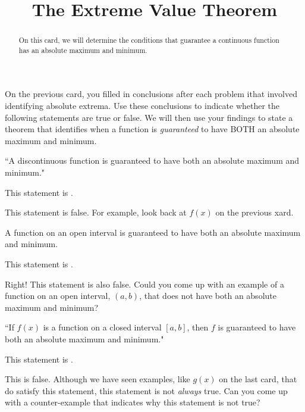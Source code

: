 \documentclass{ximera}
\title[Dig-In:]{The Extreme Value Theorem}
\begin{document}
\begin{abstract}
On this card, we will determine the conditions that guarantee a continuous function has an absolute maximum and minimum. 
\end{abstract}
\maketitle

On the previous card, you filled in conclusions after each problem ithat involved identifying absolute extrema.  Use these conclusions to indicate whether the following statements are true or false.  We will then use your findings to state a theorem that identifies when a function is \textit{guaranteed} to have BOTH an absolute maximum and minimum.  

\begin{exercise}
\begin{center} ``A discontinuous function is guaranteed to have both an absolute maximum and minimum." \end{center}

This statement is .

\begin{feedback}[correct]
This statement is false.  For example, look back at $f(x)$ on the previous xard.
\end{feedback}
\end{exercise}

\begin{exercise}
\begin{center} A function on an open interval is guaranteed to have both an absolute maximum and minimum. \end{center}

This statement is .

\begin{feedback}[correct]
Right!  This statement is also false. Could you come up with an example of a function on an open interval, $(a,b)$, that does not have both an absolute maximum and minimum?
\end{feedback}
\end{exercise}

\begin{exercise}
\begin{center} ``If $f(x)$ is a function on a closed interval $[a,b]$, then $f$ is guaranteed to have both an absolute maximum and minimum." \end{center}

This statement is .

\begin{feedback}[correct]
This is false.  Although we have seen examples, like $g(x)$ on the last card, that do satisfy this statement, this statement is not \textit{always} true.  Can you come up with a counter-example that indicates why this statement is not true?
\end{feedback}
\end{exercise}
\end{document}
